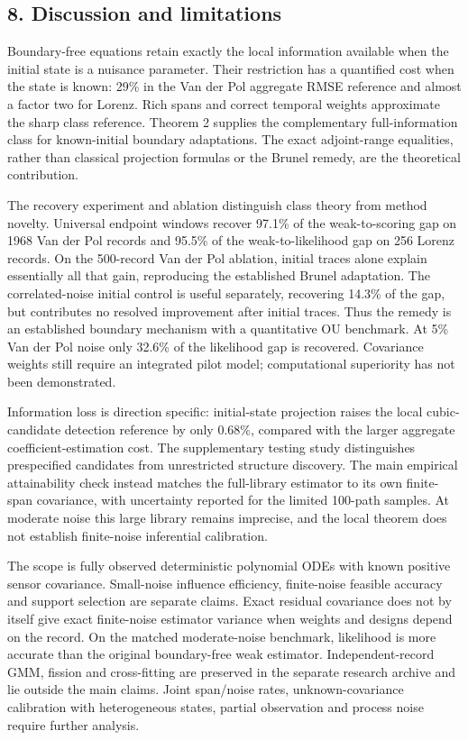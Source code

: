 \documentclass[
  american,
  11pt,
]{article}
\begin{document}
\subsection{8. Discussion and
limitations}\label{discussion-and-limitations}

Boundary-free equations retain exactly the local information available
when the initial state is a nuisance parameter. Their restriction has a
quantified cost when the state is known: 29\% in the Van der Pol
aggregate RMSE reference and almost a factor two for Lorenz. Rich spans
and correct temporal weights approximate the sharp class reference.
Theorem 2 supplies the complementary full-information class for
known-initial boundary adaptations. The exact adjoint-range equalities,
rather than classical projection formulas or the Brunel remedy, are the
theoretical contribution.

The recovery experiment and ablation distinguish class theory from
method novelty. Universal endpoint windows recover 97.1\% of the
weak-to-scoring gap on 1968 Van der Pol records and 95.5\% of the
weak-to-likelihood gap on 256 Lorenz records. On the 500-record Van der
Pol ablation, initial traces alone explain essentially all that gain,
reproducing the established Brunel adaptation. The correlated-noise
initial control is useful separately, recovering 14.3\% of the gap, but
contributes no resolved improvement after initial traces. Thus the
remedy is an established boundary mechanism with a quantitative OU
benchmark. At 5\% Van der Pol noise only 32.6\% of the likelihood gap is
recovered. Covariance weights still require an integrated pilot model;
computational superiority has not been demonstrated.

Information loss is direction specific: initial-state projection raises
the local cubic-candidate detection reference by only 0.68\%, compared
with the larger aggregate coefficient-estimation cost. The supplementary
testing study distinguishes prespecified candidates from unrestricted
structure discovery. The main empirical attainability check instead
matches the full-library estimator to its own finite-span covariance,
with uncertainty reported for the limited 100-path samples. At moderate
noise this large library remains imprecise, and the local theorem does
not establish finite-noise inferential calibration.

The scope is fully observed deterministic polynomial ODEs with known
positive sensor covariance. Small-noise influence efficiency,
finite-noise feasible accuracy and support selection are separate
claims. Exact residual covariance does not by itself give exact
finite-noise estimator variance when weights and designs depend on the
record. On the matched moderate-noise benchmark, likelihood is more
accurate than the original boundary-free weak estimator.
Independent-record GMM, fission and cross-fitting are preserved in the
separate research archive and lie outside the main claims. Joint
span/noise rates, unknown-covariance calibration with heterogeneous
states, partial observation and process noise require further analysis.
\end{document}
